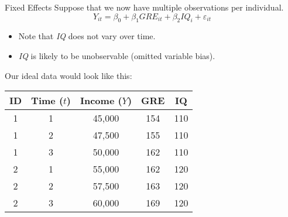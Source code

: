 \documentclass{clbeamer2024}
\begin{document}
\begin{frame}{Fixed Effects}
    Suppose that we now have multiple observations per individual.
    \begin{equation*}
        Y_{it} = \beta_0 + \beta_1 \textit{GRE}_{it} + \beta_2 \textit{IQ}_i + \varepsilon_{it}
    \end{equation*}

    \begin{itemize}
        \item Note that \textit{IQ} does not vary over time.
        \item \textit{IQ} is likely to be unobservable (omitted variable bias).
    \end{itemize}

    Our ideal data would look like this:
    \begin{table}[h!]
        \centering
        \begin{tabular}{|c|c|c|c|c|}
            \hline
            \textbf{ID} & \textbf{Time ($t$)} & \textbf{Income ($Y$)} & \textbf{GRE} & \textbf{IQ} \\
            \hline
            1 & 1 & 45,000 & 154 & 110 \\
            1 & 2 & 47,500 & 155 & 110 \\
            1 & 3 & 50,000 & 162 & 110 \\
            \hline
            2 & 1 & 55,000 & 162 & 120 \\
            2 & 2 & 57,500 & 163 & 120 \\
            2 & 3 & 60,000 & 169 & 120 \\
            \hline
        \end{tabular}
    \end{table}
\end{frame}
\end{document}
